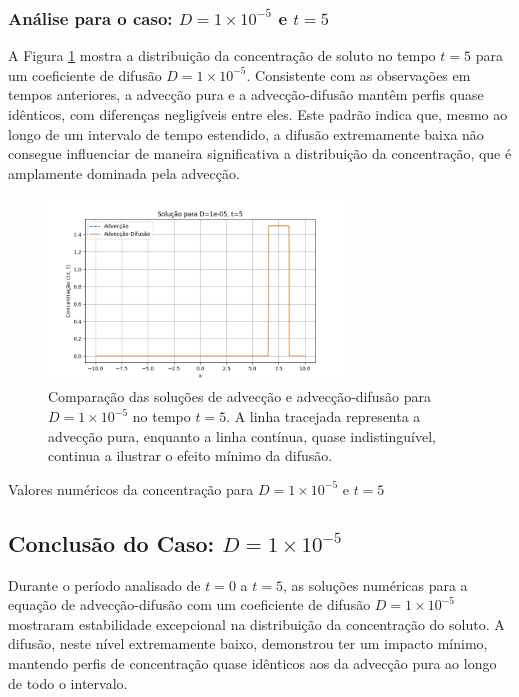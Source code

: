 \subsubsection{Análise para o caso: \( D = 1 \times 10^{-5} \) e \( t = 5 \)}
A Figura \ref{fig:advec_diffus_1e-05_t5} mostra a distribuição da concentração de soluto no tempo \( t = 5 \) para um coeficiente de difusão \( D = 1 \times 10^{-5} \). Consistente com as observações em tempos anteriores, a advecção pura e a advecção-difusão mantêm perfis quase idênticos, com diferenças negligíveis entre eles. Este padrão indica que, mesmo ao longo de um intervalo de tempo estendido, a difusão extremamente baixa não consegue influenciar de maneira significativa a distribuição da concentração, que é amplamente dominada pela advecção.

\begin{figure}[H]
    \centering
    \includegraphics[width=0.7\textwidth]{code/plot/Advec_Difus_t5_D1e-05.png}
    \caption{Comparação das soluções de advecção e advecção-difusão para \( D = 1 \times 10^{-5} \) no tempo \( t = 5 \). A linha tracejada representa a advecção pura, enquanto a linha contínua, quase indistinguível, continua a ilustrar o efeito mínimo da difusão.}
    \label{fig:advec_diffus_1e-05_t5}
\end{figure}

\begin{table}[H]
    \centering
    \caption{Valores numéricos da concentração para \( D = 1 \times 10^{-5} \) e \( t = 5 \)}
    
\end{table}



\subsection*{Conclusão do Caso: \( D = 1 \times 10^{-5} \)}
Durante o período analisado de \( t = 0 \) a \( t = 5 \), as soluções numéricas para a equação de advecção-difusão com um coeficiente de difusão \( D = 1 \times 10^{-5} \) mostraram estabilidade excepcional na distribuição da concentração do soluto. A difusão, neste nível extremamente baixo, demonstrou ter um impacto mínimo, mantendo perfis de concentração quase idênticos aos da advecção pura ao longo de todo o intervalo.

